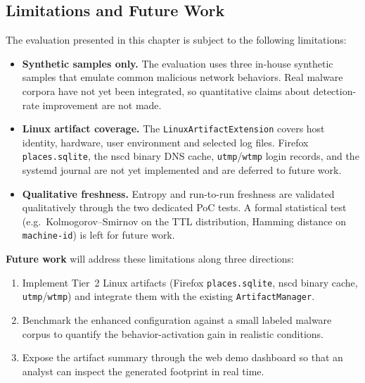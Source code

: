 
\subsection{Limitations and Future Work}
\label{sec:limitations}
The evaluation presented in this chapter is subject to the following
limitations:

\begin{itemize}
    \item \textbf{Synthetic samples only.} The evaluation uses three
    in-house synthetic samples that emulate common malicious network
    behaviors. Real malware corpora have not yet been integrated, so
    quantitative claims about detection-rate improvement are not made.
    \item \textbf{Linux artifact coverage.} The \texttt{LinuxArtifactExtension}
    covers host identity, hardware, user environment and selected log
    files. Firefox \texttt{places.sqlite}, the nscd binary DNS cache,
    \texttt{utmp}/\texttt{wtmp} login records, and the systemd journal
    are not yet implemented and are deferred to future work.
    \item \textbf{Qualitative freshness.} Entropy and run-to-run
    freshness are validated qualitatively through the two dedicated
    PoC tests. A formal statistical test (e.g.\ Kolmogorov--Smirnov on
    the TTL distribution, Hamming distance on \texttt{machine-id}) is
    left for future work.
\end{itemize}

\noindent\textbf{Future work} will address these limitations along three
directions:

\begin{enumerate}
    \item Implement Tier~2 Linux artifacts (Firefox \texttt{places.sqlite},
    nscd binary cache, \texttt{utmp}/\texttt{wtmp}) and integrate them
    with the existing \texttt{ArtifactManager}.
    \item Benchmark the enhanced configuration against a small labeled
    malware corpus to quantify the behavior-activation gain in realistic
    conditions.
    \item Expose the artifact summary through the web demo dashboard so
    that an analyst can inspect the generated footprint in real time.
\end{enumerate}

